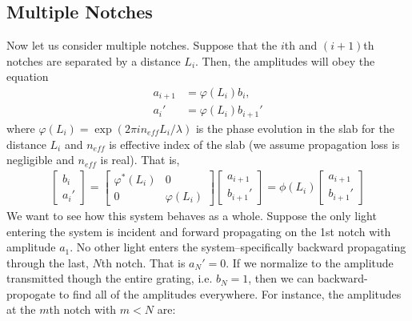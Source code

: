 \documentclass[10pt, letter, oneside,graphicx]{article}
\begin{document}
\subsection{Multiple Notches}
Now let us consider multiple notches. %
Suppose that the $i$th and $(i+1)$th notches are separated by a distance $L_i$. Then, the amplitudes will obey the equation
\begin{align*}
a_{i+1} &= \varphi(L_i) b_{i}, \\
a_i' &= \varphi(L_i) b_{i+1}'
\end{align*}
where $\varphi(L_i) = \exp(2\pi in_{eff}L_i/\lambda)$ is the phase evolution in the slab for the distance $L_i$ and $n_{eff}$ is effective index of the slab (we assume propagation loss is negligible and $n_{eff}$ is real). That is,
\begin{align*}
\left[ \begin{array}{c}
b_i \\ a_i'
\end{array} \right]
=
\left[ \begin{array}{cc}
\varphi^*(L_i) & 0 \\
0 & \varphi(L_i)
\end{array} \right]
\left[ \begin{array}{c}
a_{i+1} \\ b_{i+1}'
\end{array} \right]
=
\phi(L_i)
\left[ \begin{array}{c}
a_{i+1} \\ b_{i+1}'
\end{array} \right]
\end{align*}
We want to see how this system behaves as a whole. Suppose the only light entering the system is incident and forward propagating on the 1st notch with amplitude $a_1$. No other light enters the system--specifically backward propagating through the last, $N$th notch. That is $a_N' = 0$. If we normalize to the amplitude transmitted though the entire grating, i.e. $b_N = 1$, then we can backward-propogate to find all of the amplitudes everywhere. For instance, the amplitudes at the $m$th notch with $m < N$ are:
\end{document}
